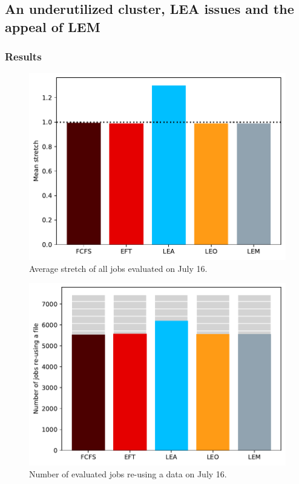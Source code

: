 \documentclass[conference,10pt]{IEEEtran}
\begin{document}
\subsection{An underutilized cluster, LEA issues and the appeal of LEM}\label{sec.07-16}

\subsubsection{Results}

\begin{figure}[tb]\centering\includegraphics[scale=0.41]{../MBSS/plot/Results_FCFS_Score_Backfill_2022-07-16->2022-07-16_V10000_Mean_Stretch_450_128_32_256_4_1024.pdf}\caption{Average stretch of all jobs evaluated on July 16.}\label{stretch.07-16}\end{figure}
\begin{figure}[tb]\centering\includegraphics[scale=0.41]{../MBSS/plot/Results_FCFS_Score_Backfill_2022-07-16->2022-07-16_V10000_Number_of_data_reuse_450_128_32_256_4_1024.pdf}\caption{Number of evaluated jobs re-using a data on July 16.}\label{reuse.07-16}\end{figure}
\end{document}

